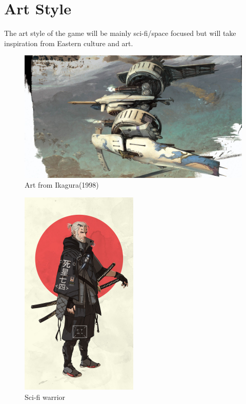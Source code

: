 \documentclass[a4paper]{scrreprt}
\begin{document}
\section{Art Style}
The art style of the game will be mainly sci-fi/space focused but will take inspiration from Eastern culture and art. 
\begin{figure}
\centering
\includegraphics[width=1\textwidth]{Ikagura}
\caption{\label{fig:art}Art from Ikagura(1998)}
\end{figure}

\begin{figure}
\centering
\includegraphics[width=0.5\textwidth]{Warrior}
\caption{Sci-fi warrior}
\end{figure}
\end{document}
